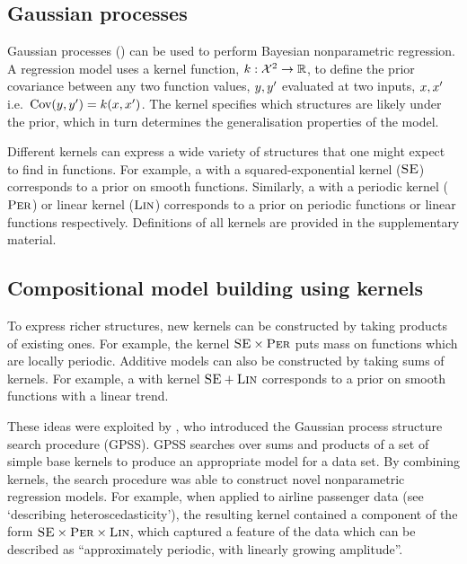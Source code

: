 \documentclass[letterpaper]{article}
\def\ie{i.e.\ }
\begin{document}
\subsection{Gaussian processes}

Gaussian processes (\gp{}) \citep{rasmussen38gaussian} can be used to perform Bayesian nonparametric regression.
A \gp{} regression model uses a kernel function, ${k : \mathcal{X}^2 \to \mathbb{R}}$, to define the prior covariance between any two function values, $y, y'$ evaluated at two inputs, $x,x'$ \ie ${\textrm{Cov}(y, y') = k(x,x')}$.
The kernel specifies which structures are likely under the \gp{} prior, which in turn determines the generalisation properties of the model.

Different kernels can express a wide variety of structures that one might expect to find in functions.
For example, a \gp{} with a squared-exponential kernel (${\textsc{SE}}$) corresponds to a prior on smooth functions.
Similarly, a \gp{} with a periodic kernel (${\textsc{Per}}$) or linear kernel (${\textsc{Lin}}$) corresponds to a prior on periodic functions or linear functions respectively.
Definitions of all kernels are provided in the supplementary material.

\subsection{Compositional model building using kernels}

To express richer structures, new kernels can be constructed by taking products of existing ones.
For example, the kernel ${\textsc{SE}} \times {\textsc{Per}}$ puts mass on functions which are locally periodic.
Additive models can also be constructed by taking sums of kernels.
For example, a \gp{} with kernel ${\textsc{SE}} + {\textsc{Lin}}$ corresponds to a prior on smooth functions with a linear trend.

These ideas were exploited by \citet{DuvLloGroetal13},  who introduced the Gaussian process structure search procedure (GPSS).
GPSS searches over sums and products of a set of simple base kernels to produce an appropriate model for a data set.
By combining kernels, the search procedure was able to construct novel nonparametric regression models.
For example, when applied to airline passenger data (see `describing heteroscedasticity'), the resulting kernel contained a component of the form ${\textsc{SE}} \times {\textsc{Per}} \times {\textsc{Lin}}$, which captured a feature of the data which can be described as ``approximately periodic, with linearly growing amplitude''.
\end{document}
